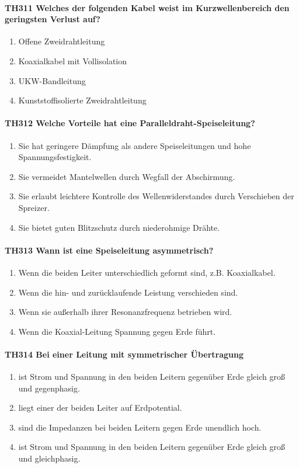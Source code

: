 \documentclass[8pt]{article}
\begin{document}
\paragraph*{TH311 Welches der folgenden Kabel weist im Kurzwellenbereich den geringsten Verlust auf?}
\begin{enumerate}[nolistsep,label=\Alph*]
\item Offene Zweidrahtleitung
\item Koaxialkabel mit Vollisolation
\item UKW-Bandleitung
\item Kunststoffisolierte Zweidrahtleitung
\end{enumerate}

\paragraph*{TH312 Welche Vorteile hat eine Paralleldraht-Speiseleitung?}
\begin{enumerate}[nolistsep,label=\Alph*]
\item Sie hat geringere Dämpfung als andere Speiseleitungen und hohe Spannungsfestigkeit.
\item Sie vermeidet Mantelwellen durch Wegfall der Abschirmung.
\item Sie erlaubt leichtere Kontrolle des Wellenwiderstandes durch Verschieben der Spreizer.
\item Sie bietet guten Blitzschutz durch niederohmige Drähte.
\end{enumerate}

\paragraph*{TH313 Wann ist eine Speiseleitung asymmetrisch?}
\begin{enumerate}[nolistsep,label=\Alph*]
\item Wenn die beiden Leiter unterschiedlich geformt sind, z.B. Koaxialkabel.
\item Wenn die hin- und zurücklaufende Leistung verschieden sind.
\item Wenn sie außerhalb ihrer Resonanzfrequenz betrieben wird.
\item Wenn die Koaxial-Leitung Spannung gegen Erde führt.
\end{enumerate}

\paragraph*{TH314 Bei einer Leitung mit symmetrischer Übertragung}
\begin{enumerate}[nolistsep,label=\Alph*]
\item ist Strom und Spannung in den beiden Leitern gegenüber Erde gleich groß und gegenphasig.
\item liegt einer der beiden Leiter auf Erdpotential.
\item sind die Impedanzen bei beiden Leitern gegen Erde unendlich hoch.
\item ist Strom und Spannung in den beiden Leitern gegenüber Erde gleich groß und gleichphasig.
\end{enumerate}
\end{document}
